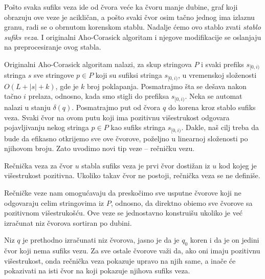 Po\v sto svaka sufiks veza ide od \v cvora ve\' ce ka \v cvoru manje dubine, graf koji obrazuju ove veze je acikli\v can, a po\v sto svaki \v cvor osim ta\v cno jednog ima izlaznu granu, radi se o obrnutom korenskom stablu. Nadalje \' cemo ovo stablo zvati \textit{stablo sufiks veza}. I originalni Aho-Corasick algoritam i njegove modifikacije se oslanjaju na preprocesiranje ovog stabla.

Originalni Aho-Corasick algoritam nalazi, za skup stringova $P$ i svaki prefiks $s_{[0,i)}$ stringa $s$ sve stringove $p \in P$ koji su sufiksi stringa $s_{[0,i)}$, u vremenskoj slo\v zenosti $O(L+|s|+k)$, gde je $k$ broj poklapanja. Posmatrajmo \v sta se de\v sava nakon ta\v cno $i$ prelaza, odnosno, kada smo stigli do prefiksa $s_{[0,i)}$. Neka se automat nalazi u stanju $\delta(q)$. Posmatrajmo put od \v cvora $q$ do korena kroz stablo sufiks veza. Svaki \v cvor na ovom putu koji ima pozitivnu vi\v sestrukost odgovara pojavljivanju nekog stringa $p \in P$ kao sufiks stringa $s_{[0,i)}$. Dakle, na\v s cilj treba da bude da efikasno otkrijemo sve ove \v cvorove, po\v zeljno u linearnoj slo\v zenosti po njihovom broju. Zato uvodimo novi tip veze -- re\v cni\v cku vezu.

\begin{dfn}
Re\v cni\v cka veza za \v cvor $u$ stabla sufiks veza je prvi \v cvor dosti\v zan iz $u$ kod kojeg je vi\v sestrukost pozitivna. Ukoliko takav \v cvor ne postoji, re\v cni\v cka veza se ne defini\v se.
\end{dfn}

Re\v cni\v cke veze nam omogu\' cavaju da presko\v cimo sve usputne \v cvorove koji ne odgovaraju celim stringovima iz $P$, odnosno, da direktno obi\dj emo sve \v cvorove sa pozitivnom vi\v sestruko\v s\' cu. Ove veze se jednostavno konstrui\v su ukoliko je ve\' c izra\v cunat niz \v cvorova sortiran po dubini.

\noindent
\begin{minipage}[l]{\textwidth}

\end{minipage}

Niz $q$ je prethodno izra\v cunati niz \v cvorova, jasno je da je $q_0$ koren i da je on jedini \v cvor koji nema sufiks vezu. Za sve ostale \v cvorove va\v zi da, ako oni imaju pozitivnu vi\v sestrukost, onda re\v cni\v cka veza pokazuje upravo na njih same, a ina\v ce \' ce pokazivati na isti \v cvor na koji pokazuje njihova sufiks veza.

